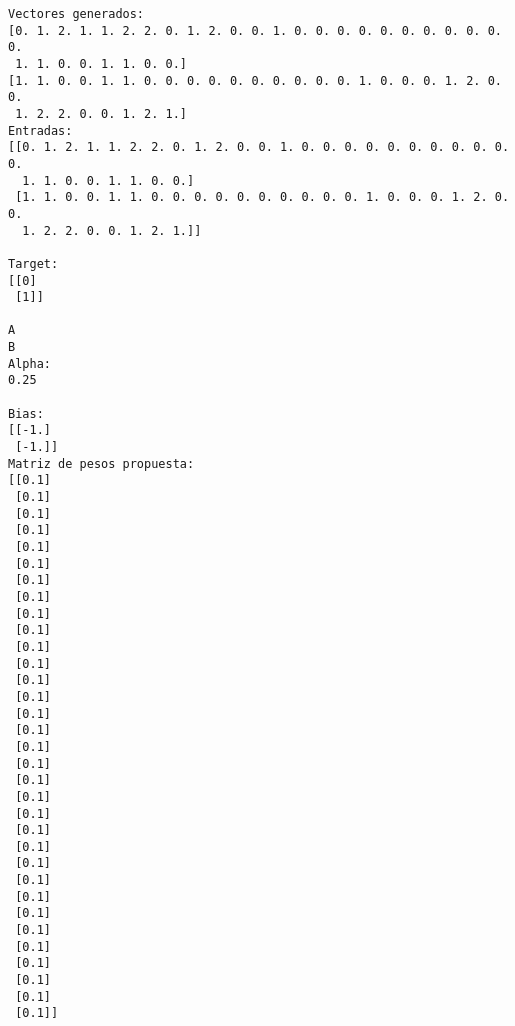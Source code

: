     \begin{Verbatim}[commandchars=\\\{\}]
Vectores generados:
[0. 1. 2. 1. 1. 2. 2. 0. 1. 2. 0. 0. 1. 0. 0. 0. 0. 0. 0. 0. 0. 0. 0. 0.
 1. 1. 0. 0. 1. 1. 0. 0.]
[1. 1. 0. 0. 1. 1. 0. 0. 0. 0. 0. 0. 0. 0. 0. 0. 1. 0. 0. 0. 1. 2. 0. 0.
 1. 2. 2. 0. 0. 1. 2. 1.]
Entradas:
[[0. 1. 2. 1. 1. 2. 2. 0. 1. 2. 0. 0. 1. 0. 0. 0. 0. 0. 0. 0. 0. 0. 0. 0.
  1. 1. 0. 0. 1. 1. 0. 0.]
 [1. 1. 0. 0. 1. 1. 0. 0. 0. 0. 0. 0. 0. 0. 0. 0. 1. 0. 0. 0. 1. 2. 0. 0.
  1. 2. 2. 0. 0. 1. 2. 1.]]

Target:
[[0]
 [1]]

A
B
Alpha:
0.25

Bias:
[[-1.]
 [-1.]]
Matriz de pesos propuesta:
[[0.1]
 [0.1]
 [0.1]
 [0.1]
 [0.1]
 [0.1]
 [0.1]
 [0.1]
 [0.1]
 [0.1]
 [0.1]
 [0.1]
 [0.1]
 [0.1]
 [0.1]
 [0.1]
 [0.1]
 [0.1]
 [0.1]
 [0.1]
 [0.1]
 [0.1]
 [0.1]
 [0.1]
 [0.1]
 [0.1]
 [0.1]
 [0.1]
 [0.1]
 [0.1]
 [0.1]
 [0.1]
 [0.1]]

    \end{Verbatim}

